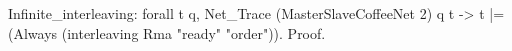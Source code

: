 Infinite_interleaving:
  forall t q,
   Net_Trace (MasterSlaveCoffeeNet 2) q t ->
   t |= (Always (interleaving Rma "ready" "order")).
Proof.